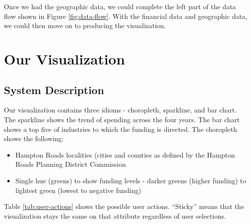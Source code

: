 \documentclass[10pt,journal,compsoc]{IEEEtran}
\begin{document}
Once we had the geographic data, we could complete the left part of the data flow shown in Figure \ref{fig:data-flow}.  With the financial data and geographic data, we could then move on to producing the visualization.

\section{Our Visualization}

\subsection{System Description}
Our visualization contains three idioms - choropleth, sparkline, and bar chart. The sparkline shows the trend of spending across the four years. The bar chart shows a top five of industries to which the funding is directed. The choropleth shows the following:

\begin{itemize}
\item Hampton Roads localities (cities and counties as defined by the Hampton Roads Planning District Commission
\item Single hue (greens) to show funding levels - darker greens (higher funding) to lightest green (lowest to negative funding)
\end{itemize}

Table \ref{tab:user-actions} shows the possible user actions. ``Sticky'' means that the visualization stays the same on that attribute regardless of user selections.
\end{document}
